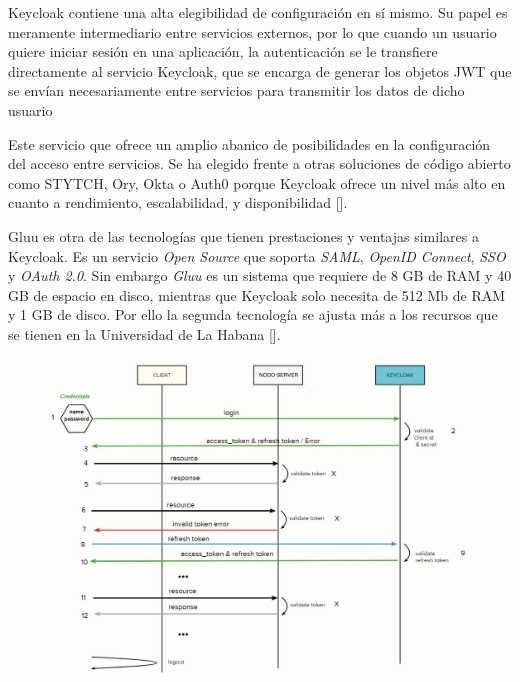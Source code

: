 Keycloak contiene una alta elegibilidad de configuración en sí mismo. Su papel
es meramente intermediario entre servicios externos, por lo que cuando un
usuario quiere iniciar sesión en una aplicación, la autenticación se le transfiere
directamente al servicio Keycloak, que se encarga de generar los objetos JWT
que se envían necesariamente entre servicios para transmitir los datos de dicho
usuario

Este servicio que ofrece un amplio abanico de posibilidades en la configuración del acceso entre servicios. Se ha elegido frente a otras soluciones de código abierto como STYTCH, Ory, Okta o Auth0 porque Keycloak ofrece un nivel más alto en cuanto a rendimiento, escalabilidad, y disponibilidad [\cite{lobato2022regulacion}]. 

Gluu es otra de las tecnologías que tienen prestaciones y ventajas similares a Keycloak. Es un servicio \textit{Open Source} que soporta \textit{SAML}, \textit{OpenID Connect}, \textit{SSO} y \textit{OAuth 2.0}. Sin embargo \textit{Gluu} es un sistema que requiere de 8 GB de RAM y 40 GB de espacio en disco, mientras que Keycloak solo necesita de 512 Mb de RAM y 1 GB de disco. Por ello la segunda tecnología se ajusta más a los recursos que se tienen en la Universidad de La Habana [\cite{vassallo2017continuous}].

\begin{figure}[H]
	\centering
	\hspace*{-1.1in}
	\includegraphics[width=1.3\linewidth]{"Graphics/diagrama de flujo del prototipo del servicio"}
	\caption{}
	\label{fig:diagrama-de-flujo-del-prototipo-del-servicio}
\end{figure}

